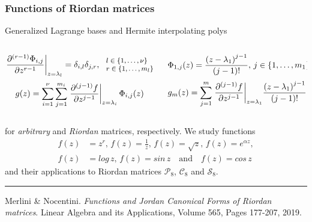 \documentclass[9pt]{beamer}
\begin{document}
\begin{frame}[fragile]
\frametitle{Functions of Riordan matrices}
Generalized Lagrange bases and Hermite interpolating polys
\begin{columns}
    \begin{column}{0.5\textwidth}
        \begin{displaymath}
        \footnotesize
        \left. \frac{\partial^{(r-1)}{\Phi_{i,j}}}{\partial{z}^{r-1}} \right|_{z=\lambda_{l}} = \delta_{i,l}\delta_{j,r},
        \,
        \begin{array}{l}
            l\in \lbrace 1, \ldots, \nu \rbrace \\
            r \in \lbrace 1, \ldots, m_{l} \rbrace
        \end{array}
        \end{displaymath}
        \begin{displaymath}
        \footnotesize
        g(z) = \sum_{i=1}^{\nu}{\sum_{j=1}^{m_{i}}{ \left.
        \frac{\partial^{(j-1)}{f}}{\partial{z}^{j-1}} \right|_{z=\lambda_{i}}\Phi_{i,j}(z) }}
        \end{displaymath}
    \end{column}
    \vrule{}
    \begin{column}{0.5\textwidth}
        \begin{displaymath}
        \footnotesize
          \Phi_{1,j}(z) = \frac{\left(z-\lambda_{1}\right)^{j-1}}{(j-1)!},
          \, j\in \lbrace 1,\ldots, m_{1} \rbrace
        \end{displaymath}
        \begin{displaymath}
        \footnotesize
        g_{m}(z) = {\sum_{j=1}^{m}{ \left.
        \frac{\partial^{(j-1)}{f}}{\partial{z}^{j-1}} \right|_{z=\lambda_{1}}}}
        \frac{\left(z-\lambda_{1}\right)^{j-1}}{(j-1)!}
        \end{displaymath}
    \end{column}
\end{columns}
for \textit{arbitrary} and \textit{Riordan} matrices, respectively.
We study functions
\begin{displaymath}
\begin{split}
f(z)&=z^{r},\,{f(z)=\frac{1}{z}},\,{f(z)=\sqrt{z}},\,{f(z)=e^{\alpha z}},\\
f(z)&=log\,{z},\,f(z)=sin\,{z}\quad\text{and}\quad f(z)=cos\,{z}
\end{split}
\end{displaymath}
and their applications to Riordan matrices $\mathcal{P}_{8}$, $\mathcal{C}_{8}$
and $\mathcal{S}_{8}$.
\vfill
\noindent\rule{\textwidth}{0.1pt}
{\footnotesize
Merlini \& Nocentini. \textit{Functions and Jordan Canonical Forms of Riordan
matrices}. \newline Linear Algebra and its Applications, Volume 565, Pages 177-207, 2019.}
\end{frame}
\end{document}
